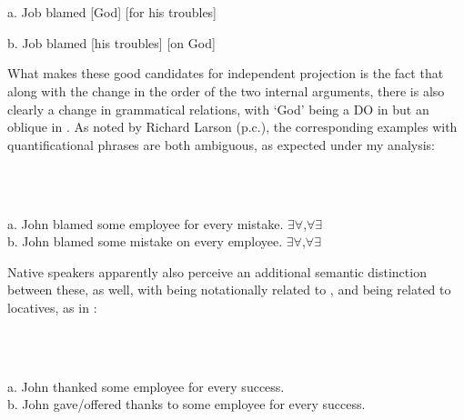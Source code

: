 \documentclass[output=paper,modfonts, nonflat]{langsci/langscibook}
\begin{document}
\begin{styleinnerExample}
\ea%
    \label{ex:key:56}
    \gll\\
        \\
    \glt
    \z

           a.  Job blamed [God] [for his troubles]   \citep{Larson1990}
\end{styleinnerExample}

\begin{styleinnerExample}
  b.  Job blamed [his troubles] [on God]
\end{styleinnerExample}

What makes these good candidates for independent projection is the fact that along with the change in the order of the two internal arguments, there is also clearly a change in grammatical relations, with ‘God’ being a DO in  but an oblique in . As noted by Richard Larson (p.c.), the corresponding examples with quantificational phrases are both ambiguous, as expected under my analysis:

\begin{styleinnerExample}
\ea%
    \label{ex:key:57}
    \gll\\
        \\
    \glt
    \z

           a.  John blamed some employee for every mistake.   ${\exists}{\forall}$,${\forall}{\exists}$  \\
b.   John blamed some mistake on every employee.   ${\exists}{\forall}$,${\forall}{\exists}$\\\end{styleinnerExample}

Native speakers apparently also perceive an additional semantic distinction between these, as well, with  being notationally related to , and  being related to locatives, as in :

\begin{styleinnerExample}
\ea%
    \label{ex:key:58}
    \gll\\
        \\
    \glt
    \z

          a.  John thanked some employee for every success.\\
b.  John gave/offered thanks to some employee for every success.
\end{styleinnerExample}
\end{document}
